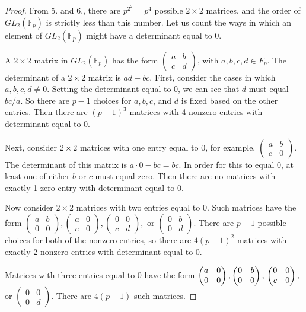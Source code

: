 \documentclass{article}
\begin{document}
\begin{proof}
    From 5. and 6., there are $p^{2^2} = p^4$ possible $2 \times 2$ matrices, and the order of $GL_2(\mathbb{F}_p)$ is strictly less than this number. Let us count the ways in which an element of $GL_2(\mathbb{F}_p)$ might have a determinant equal to 0.

    A $2 \times 2$ matrix in $GL_2(\mathbb{F}_p)$ has the form $\begin{pmatrix}a & b\\c & d\end{pmatrix}$, with $a, b, c, d \in F_p$. The determinant of a $2 \times 2$ matrix is $ad - bc$. First, consider the cases in which $a, b, c, d \neq 0$. Setting the determinant equal to 0, we can see that $d$ must equal $bc / a$. So there are $p - 1$ choices for $a, b, c$, and $d$ is fixed based on the other entries. Then there are $(p - 1)^3$ matrices with 4 nonzero entries with determinant equal to 0.

    Next, consider $2 \times 2$ matrices with one entry equal to 0, for example, $\begin{pmatrix}a & b\\c & 0\end{pmatrix}$. The determinant of this matrix is $a \cdot 0 - bc = bc$. In order for this to equal 0, at least one of either $b$ or $c$ must equal zero. Then there are no matrices with exactly 1 zero entry with determinant equal to 0.

    Now consider $2 \times 2$ matrices with two entries equal to 0. Such matrices have the form $\begin{pmatrix}a & b\\0 & 0\end{pmatrix}, \begin{pmatrix}a & 0\\c & 0\end{pmatrix}, \begin{pmatrix}0 & 0\\c & d\end{pmatrix},$ or $\begin{pmatrix}0 & b\\0 & d\end{pmatrix}$. There are $p - 1$ possible choices for both of the nonzero entries, so there are $4(p - 1)^2$ matrices with exactly 2 nonzero entries with determinant equal to 0.

    Matrices with three entries equal to 0 have the form $\begin{pmatrix}a & 0\\0 & 0\end{pmatrix}, \begin{pmatrix}0 & b\\0 & 0\end{pmatrix},\newline \begin{pmatrix}0 & 0\\c & 0\end{pmatrix},$ or $\begin{pmatrix}0 & 0\\0 & d\end{pmatrix}$. There are $4(p - 1)$ such matrices.


\end{proof}
\end{document}

